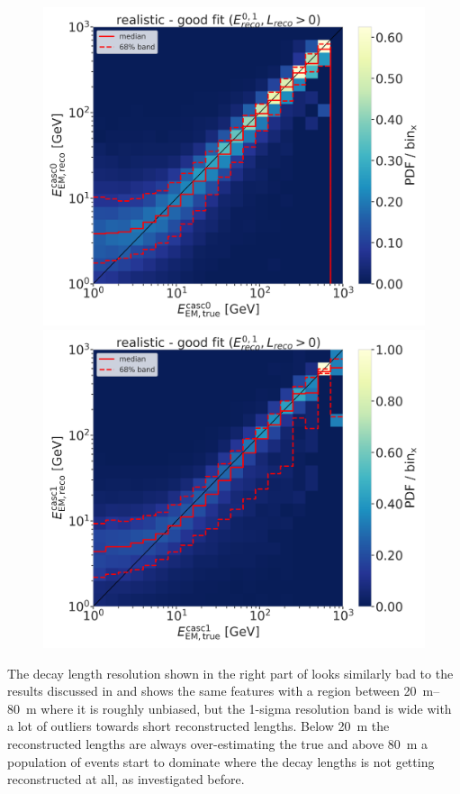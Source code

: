 \begin{figure}[h]
    \centering
    \includegraphics[width=0.49\linewidth]{figures/model_independent_simulation/results/realistic/2d_hists/194603_casc0_reco_energy_vs_casc0_true_energy_goodfit_step_contours.png}
    \includegraphics[width=0.49\linewidth]{figures/model_independent_simulation/results/realistic/2d_hists/194603_casc1_reco_energy_vs_casc1_true_energy_goodfit_step_contours.png}
    \caption[]{}
\end{figure}

The decay length resolution shown in the right part of  looks similarly bad to the results discussed in  and shows the same features with a region between \SIrange[range-phrase={~and~}]{20}{80}{\meter} where it is roughly unbiased, but the 1-sigma resolution band is wide with a lot of outliers towards short reconstructed lengths. Below \SI{20}{\meter} the reconstructed lengths are always over-estimating the true and above \SI{80}{\meter} a population of events start to dominate where the decay lengths is not getting reconstructed at all, as investigated before.

